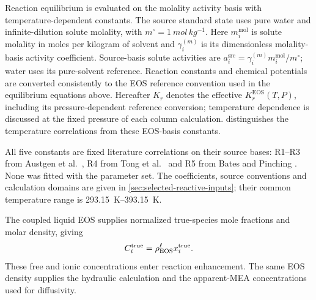 Reaction equilibrium is evaluated on the molality activity basis with temperature-dependent constants.
The source standard state uses pure water and infinite-dilution solute molality, with \(m^\circ=\qty{1}{mol\,kg^{-1}}\).
Here $m_i^{\mathrm{mol}}$ is solute molality in moles per kilogram of solvent and $\gamma_i^{(m)}$ is its dimensionless molality-basis activity coefficient.
Source-basis solute activities are \(a_i^{\mathrm{src}}=\gamma_i^{(m)}m_i^{\mathrm{mol}}/m^\circ\); water uses its pure-solvent reference.
Reaction constants and chemical potentials are converted consistently to the EOS reference convention used in the equilibrium equations above.
Hereafter $K_r$ denotes the effective $K_r^{\mathrm{EOS}}(T,P)$, including its pressure-dependent reference conversion; temperature dependence is discussed at the fixed pressure of each column calculation.
 distinguishes the temperature correlations from these EOS-basis constants.

All five constants are fixed literature correlations on their source bases: R1--R3 from Austgen et al.\ \cite{Austgen1991}, R4 from Tong et al.\ \cite{Tong2012} and R5 from Bates and Pinching \cite{batesAcidicDissociationConstant1951}.
None was fitted with the parameter set.
The coefficients, source conventions and calculation domains are given in \cref{sec:selected-reactive-inputs}; their common temperature range is \qtyrange{293.15}{393.15}{K}.

The coupled liquid EOS supplies normalized true-species mole fractions and molar density, giving
\begin{equation}
C_i^{\mathrm{true}}=\rho_{\mathrm{EOS}}^{\ell}x_i^{\mathrm{true}}.
\end{equation}
These free and ionic concentrations enter reaction enhancement.
The same EOS density supplies the hydraulic calculation and the apparent-MEA concentrations used for diffusivity.


